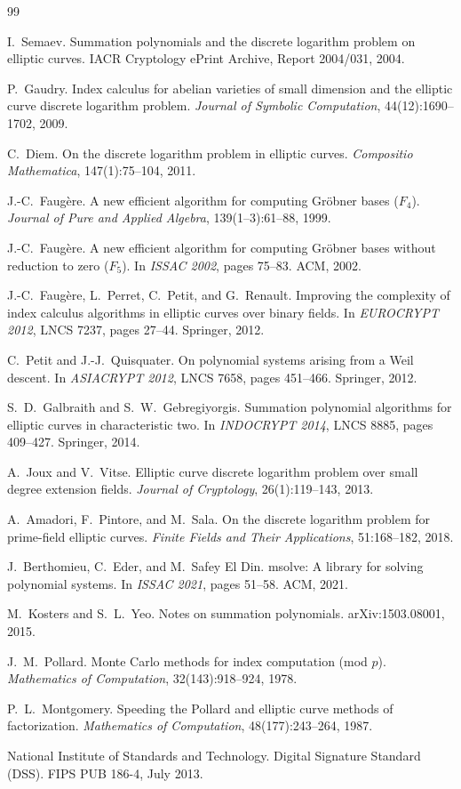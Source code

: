\documentclass[10pt,a4paper]{article}
\theoremstyle{remark}
\begin{document}
\begin{thebibliography}{99}

I.~Semaev.
Summation polynomials and the discrete logarithm problem on elliptic curves.
IACR Cryptology ePrint Archive, Report 2004/031, 2004.

P.~Gaudry.
Index calculus for abelian varieties of small dimension and the elliptic curve discrete logarithm problem.
\emph{Journal of Symbolic Computation}, 44(12):1690--1702, 2009.

C.~Diem.
On the discrete logarithm problem in elliptic curves.
\emph{Compositio Mathematica}, 147(1):75--104, 2011.

J.-C.~Faug\`ere.
A new efficient algorithm for computing Gr\"obner bases ($F_4$).
\emph{Journal of Pure and Applied Algebra}, 139(1--3):61--88, 1999.

J.-C.~Faug\`ere.
A new efficient algorithm for computing Gr\"obner bases without reduction to zero ($F_5$).
In \emph{ISSAC 2002}, pages 75--83. ACM, 2002.

J.-C.~Faug\`ere, L.~Perret, C.~Petit, and G.~Renault.
Improving the complexity of index calculus algorithms in elliptic curves over binary fields.
In \emph{EUROCRYPT 2012}, LNCS 7237, pages 27--44. Springer, 2012.

C.~Petit and J.-J.~Quisquater.
On polynomial systems arising from a Weil descent.
In \emph{ASIACRYPT 2012}, LNCS 7658, pages 451--466. Springer, 2012.

S.~D.~Galbraith and S.~W.~Gebregiyorgis.
Summation polynomial algorithms for elliptic curves in characteristic two.
In \emph{INDOCRYPT 2014}, LNCS 8885, pages 409--427. Springer, 2014.

A.~Joux and V.~Vitse.
Elliptic curve discrete logarithm problem over small degree extension fields.
\emph{Journal of Cryptology}, 26(1):119--143, 2013.

A.~Amadori, F.~Pintore, and M.~Sala.
On the discrete logarithm problem for prime-field elliptic curves.
\emph{Finite Fields and Their Applications}, 51:168--182, 2018.

J.~Berthomieu, C.~Eder, and M.~Safey El Din.
msolve: A library for solving polynomial systems.
In \emph{ISSAC 2021}, pages 51--58. ACM, 2021.

M.~Kosters and S.~L.~Yeo.
Notes on summation polynomials.
arXiv:1503.08001, 2015.

J.~M.~Pollard.
Monte Carlo methods for index computation (mod $p$).
\emph{Mathematics of Computation}, 32(143):918--924, 1978.

P.~L.~Montgomery.
Speeding the Pollard and elliptic curve methods of factorization.
\emph{Mathematics of Computation}, 48(177):243--264, 1987.

National Institute of Standards and Technology.
Digital Signature Standard (DSS).
FIPS PUB 186-4, July 2013.

\end{thebibliography}
\end{document}
